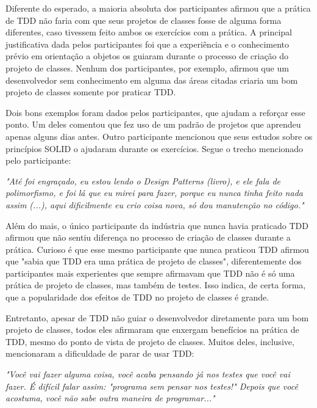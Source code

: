 \documentclass[conference]{IEEEtran}
\begin{document}
Diferente do esperado, a maioria absoluta dos participantes afirmou que 
a prática de TDD não faria com que seus projetos de classes fosse de alguma forma diferentes, caso tivessem
feito ambos os exercícios com a prática.
A principal justificativa dada pelos participantes foi que a experiência e o conhecimento prévio
em orientação a objetos os guiaram durante o processo de criação do projeto de classes. Nenhum dos
participantes, por exemplo, afirmou que um desenvolvedor sem conhecimento em alguma das áreas
citadas criaria um bom projeto de classes somente por praticar TDD.

Dois bons exemplos foram dados pelos participantes, que ajudam a reforçar esse ponto. Um deles
comentou que fez uso de um padrão de projetos \cite{gof} que aprendeu apenas alguns dias antes.
Outro participante mencionou que seus estudos sobre os princípios SOLID
o ajudaram durante os exercícios. Segue o trecho mencionado pelo participante:

\begin{framed}
\textit{"Até foi engraçado, eu estou lendo o Design Patterns (livro), e ele fala de polimorfismo, e foi
lá que eu mirei para fazer, porque eu nunca tinha feito nada assim (...), aqui dificilmente eu crio
coisa nova, só dou manutenção no código."}
\end{framed}

Além do mais, o único participante da indústria que nunca havia
praticado TDD afirmou que não sentiu diferença no processo de criação de classes durante
a prática.
Curioso é que esse mesmo participante que nunca praticou TDD afirmou que "sabia que TDD era uma prática de projeto de classes",
diferentemente dos participantes mais experientes que sempre afirmavam que TDD não é só uma prática de projeto de classes,
mas também de testes. Isso indica, de certa forma, que a popularidade dos efeitos de TDD no projeto de classes
é grande.

Entretanto, apesar de TDD não guiar o desenvolvedor diretamente para um bom projeto de classes,
todos eles afirmaram que enxergam benefícios na prática de TDD, mesmo do
ponto de vista de projeto de classes. Muitos deles, inclusive, mencionaram a dificuldade
de parar de usar TDD:

\begin{framed}
\textit{"Você vai fazer alguma coisa, você acaba pensando já nos testes que você vai fazer. É difícil 
falar assim: "programa sem pensar nos testes!" Depois que você acostuma, você não sabe outra
maneira de programar..."}
\end{framed}
\end{document}
